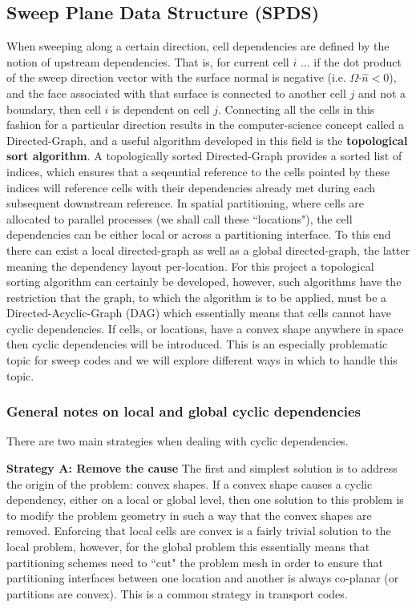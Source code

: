 \documentclass[11pt,letterpaper,titlepage]{article}
\numberwithin{equation}{section}
\begin{document}
\vspace{1cm}
\subsection{Sweep Plane Data Structure (SPDS)}
When sweeping along a certain direction, cell dependencies are defined by the notion of upstream dependencies. That is, for current cell $i$ ... if the dot product of the sweep direction vector with the surface normal is negative (i.e. $\Omega \boldsymbol{\cdot} \hat{n} < 0$), and the face associated with that surface is connected to another cell $j$ and not a boundary, then cell $i$ is dependent on cell $j$. Connecting all the cells in this fashion for a particular direction results in the computer-science concept called a Directed-Graph, and a useful algorithm developed in this field is the \textbf{topological sort algorithm}. A topologically sorted Directed-Graph provides a sorted list of indices, which ensures that a seqeuntial reference to the cells pointed by these indices will reference cells with their dependencies already met during each subsequent downstream reference.
\newline
\newline
In spatial partitioning, where cells are allocated to parallel processes (we shall call these ``locations"), the cell dependencies can be either local or across a partitioning interface. To this end there can exist a local directed-graph as well as a global directed-graph, the latter meaning the dependency layout per-location.
For this project a topological sorting algorithm can certainly be developed, however, such algorithms have the restriction that the graph, to which the algorithm is to be applied, must be a Directed-Acyclic-Graph (DAG) which essentially means that cells cannot have cyclic dependencies. If cells, or locations, have a convex shape anywhere in space then cyclic dependencies will be introduced. This is an especially problematic topic for sweep codes and we will explore different ways in which to handle this topic.

\subsubsection{General notes on local and global cyclic dependencies}
There are two main strategies when dealing with cyclic dependencies.\newline

\textbf{Strategy A: Remove the cause}\newline
The first and simplest solution is to address the origin of the problem: convex shapes. If a convex shape causes a cyclic dependency, either on a local or global level, then one solution to this problem is to modify the problem geometry in such a way that the convex shapes are removed. Enforcing that local cells are convex is a fairly trivial solution to the local problem, however, for the global problem this essentially means that partitioning schemes need to ``cut" the problem mesh in order to ensure that partitioning interfaces between one location and another is always co-planar (or partitions are convex). This is a common strategy in transport codes.
\end{document}
